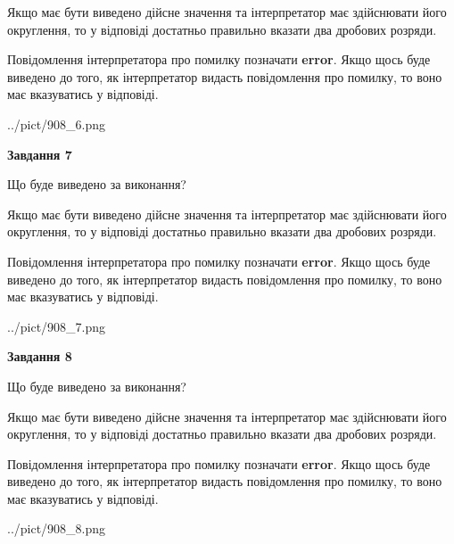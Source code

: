 \documentclass[12pt, ukrainian]{article}
\begin{document}
{\begin {Large}
Якщо має бути виведено дійсне значення та інтерпретатор має здійснювати його округлення, 
то у відповіді достатньо правильно вказати два дробових розряди.

Повідомлення інтерпретатора про помилку позначати \textbf{error}.
Якщо щось буде виведено до того, як інтерпретатор видасть повідомлення про помилку, 
то воно має вказуватись у відповіді. \par

\begin{center}
	{../pict/908_6.png}
\end{center}
\newpage

{\begin {center}\textbf{Завдання 7}\end {center}}\par
Що буде виведено за виконання? \par

Якщо має бути виведено дійсне значення та інтерпретатор має здійснювати його округлення, 
то у відповіді достатньо правильно вказати два дробових розряди.

Повідомлення інтерпретатора про помилку позначати \textbf{error}.
Якщо щось буде виведено до того, як інтерпретатор видасть повідомлення про помилку, 
то воно має вказуватись у відповіді. \par

\begin{center}
	{../pict/908_7.png}
\end{center}
\newpage

{\begin {center}\textbf{Завдання 8}\end {center}}\par
Що буде виведено за виконання? \par

Якщо має бути виведено дійсне значення та інтерпретатор має здійснювати його округлення, 
то у відповіді достатньо правильно вказати два дробових розряди.

Повідомлення інтерпретатора про помилку позначати \textbf{error}.
Якщо щось буде виведено до того, як інтерпретатор видасть повідомлення про помилку, 
то воно має вказуватись у відповіді. \par

\begin{center}
	{../pict/908_8.png}
\end{center}
\newpage


\end{Large}}
\end{document}
